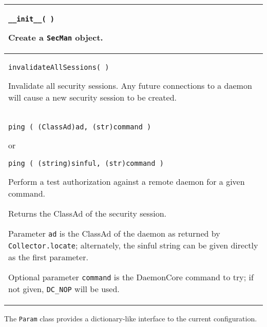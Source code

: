 \begin{flushleft}
\begin{tabular}{|p{16cm}|} \hline

\texttt{\_\_init\_\_( )}

Create a \texttt{SecMan} object.
\\ \hline
\texttt{invalidateAllSessions( )}

Invalidate all security sessions.
Any future connections to a daemon will cause a new security session 
to be created.

\\ \hline
\texttt{ping ( (ClassAd)ad, (str)command )}

or

\texttt{ping ( (string)sinful, (str)command )}

Perform a test authorization against a remote daemon for a given
command.

Returns the ClassAd of the security session.

Parameter \texttt{ad} is the ClassAd of the daemon as returned by
\texttt{Collector.locate}; alternately, the sinful string can be given
directly as the first parameter.

Optional parameter \texttt{command} is the DaemonCore command to
try; if not given, \texttt{DC\_NOP} will be used.

\\ \hline

\end{tabular}
\end{flushleft}

The \texttt{Param} class provides a dictionary-like interface
to the current configuration.

